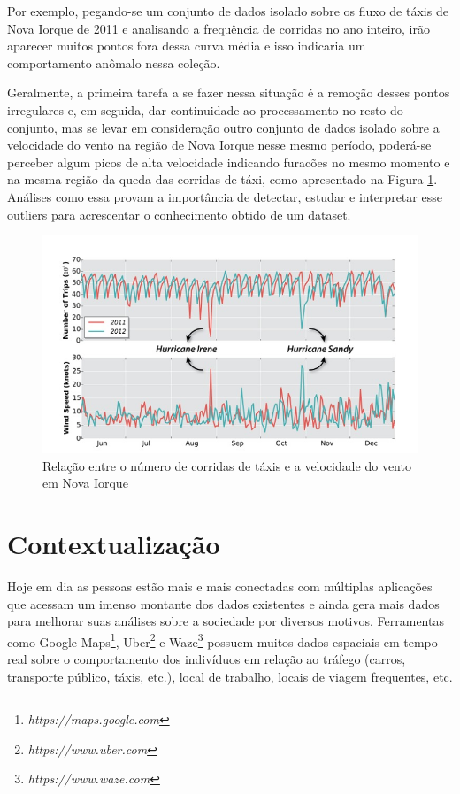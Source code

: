 Por exemplo, pegando-se um conjunto de dados isolado sobre os fluxo de táxis de Nova Iorque de 2011 e analisando a frequência de corridas no ano inteiro, irão aparecer muitos pontos fora dessa curva média e isso indicaria um comportamento anômalo nessa coleção.

Geralmente, a primeira tarefa a se fazer nessa situação é a remoção desses pontos irregulares e, em seguida, dar continuidade ao processamento no resto do conjunto, mas se levar em consideração outro conjunto de dados isolado sobre a velocidade do vento na região de Nova Iorque nesse mesmo período, poderá-se perceber algum picos de alta velocidade indicando furacões no mesmo momento e na mesma região da queda das corridas de táxi, como apresentado na Figura \ref{fig:freire-paper-taxi-wind}. Análises como essa provam a importância de detectar, estudar e interpretar esse outliers para acrescentar o conhecimento obtido de um dataset.

\begin{figure}[t]
	\centering
	\includegraphics[width=\textwidth]{images/outlier-freire-figure-1}
	\caption{Relação entre o número de corridas de táxis e a velocidade do vento em Nova Iorque \cite{DBLP:journals/debu/FreireCVZ16}}
	\label{fig:freire-paper-taxi-wind}
	\vspace{-10pt}
\end{figure}

\section{Contextualização}

Hoje em dia as pessoas estão mais e mais conectadas com múltiplas aplicações que acessam um imenso montante dos dados existentes e ainda gera mais dados para melhorar suas análises sobre a sociedade por diversos motivos. Ferramentas como Google Maps\footnote{\it https://maps.google.com}, Uber\footnote{\it https://www.uber.com} e Waze\footnote{\it https://www.waze.com} possuem muitos dados espaciais em tempo real sobre o comportamento dos indivíduos em relação ao tráfego (carros, transporte público, táxis, etc.), local de trabalho, locais de viagem frequentes, etc.

